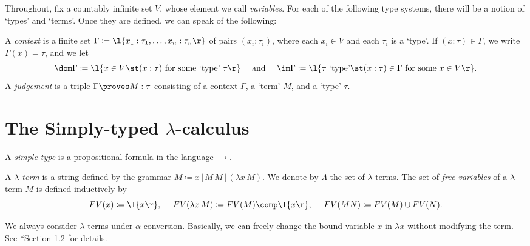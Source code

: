 \documentclass[reqno]{amsart}
\begin{document}
    Throughout, fix a countably infinite set $V$, whose element we call \textit{variables}. For each of the following type systems, there will be a notion of `types' and `terms'. Once they are defined, we can speak of the following:

    \begin{definition*}
        A \textit{context} is a finite set $\Gamma\coloneqq\l\{x_1:\tau_1,\dots,x_n:\tau_n\r\}$ of pairs $(x_i:\tau_i)$, where each $x_i\in V$ and each $\tau_i$ is a `type'. If $(x:\tau)\in\Gamma$, we write $\Gamma(x)=\tau$, and we let
        \begin{equation*}
            \dom\Gamma\coloneqq\l\{x\in V\st(x:\tau)\textrm{ for some `type' }\tau\r\}\ \ \ \ \textrm{and}\ \ \ \ \im\Gamma\coloneqq\l\{\tau\textrm{ `type'}\st(x:\tau)\in\Gamma\textrm{ for some }x\in V\r\}.
        \end{equation*}
        A \textit{judgement} is a triple $\Gamma\proves M:\tau$ consisting of a context $\Gamma$, a `term' $M$, and a `type' $\tau$.
    \end{definition*}

    \section{The Simply-typed $\lambda$-calculus}

    \begin{definition}
        A \textit{simple type} is a propositional formula in the language $\rightarrow$.
    \end{definition}

    \begin{definition}
        A \textit{$\lambda$-term} is a string defined by the grammar $M\coloneqq x\,|\,M\,M\,|\,(\lambda x\,M)$. We denote by $\Lambda$ the set of $\lambda$-terms. The set of \textit{free variables} of a $\lambda$-term $M$ is defined inductively by
        \begin{equation*}
            FV(x)\coloneqq\l\{x\r\},\ \ \ \ FV(\lambda x\,M)\coloneqq FV(M)\comp\l\{x\r\},\ \ \ \ FV(MN)\coloneqq FV(M)\cup FV(N).
        \end{equation*}
    \end{definition}

    \begin{notation}
        We always consider $\lambda$-terms under $\alpha$-conversion. Basically, we can freely change the bound variable $x$ in $\lambda x$ without modifying the term. See \cite{SU06}*{Section 1.2} for details.
    \end{notation}
\end{document}
